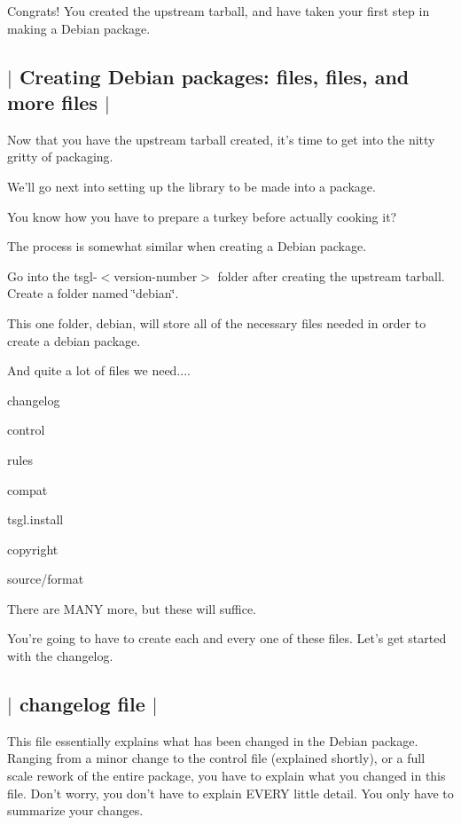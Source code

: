 Congrats! You created the upstream tarball, and have taken your first step in making a Debian package. 

 \subsection*{$\vert$ Creating Debian packages\-: files, files, and more files $\vert$ }

Now that you have the upstream tarball created, it's time to get into the nitty gritty of packaging.

We'll go next into setting up the library to be made into a package.

You know how you have to prepare a turkey before actually cooking it?

The process is somewhat similar when creating a Debian package.

Go into the tsgl-\/$<$version-\/number$>$ folder after creating the upstream tarball. Create a folder named \char`\"{}debian\char`\"{}.

This one folder, debian, will store all of the necessary files needed in order to create a debian package.

And quite a lot of files we need....


\begin{DoxyItemize}
\item changelog
\item control
\item rules
\item compat
\item tsgl.\-install
\item copyright
\item source/format
\end{DoxyItemize}

There are M\-A\-N\-Y more, but these will suffice.

You're going to have to create each and every one of these files. Let's get started with the changelog. 

 \subsection*{$\vert$ changelog file $\vert$ }

This file essentially explains what has been changed in the Debian package. Ranging from a minor change to the control file (explained shortly), or a full scale rework of the entire package, you have to explain what you changed in this file. Don't worry, you don't have to explain E\-V\-E\-R\-Y little detail. You only have to summarize your changes.

